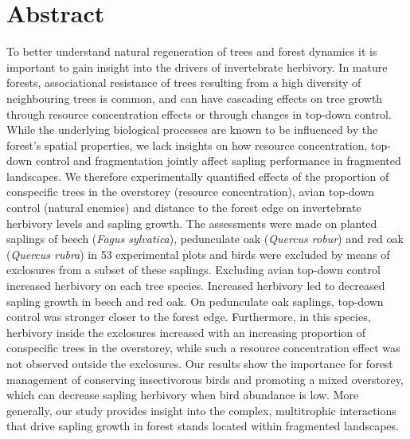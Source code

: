 \documentclass[10pt, twoside]{book} %
\begin{document}
	\section{Abstract}
	To better understand natural regeneration of trees and forest dynamics it is important to gain insight into the drivers of invertebrate herbivory. In mature forests, associational resistance of trees resulting from a high diversity of neighbouring trees is common, and can have cascading effects on tree growth through resource concentration effects or through changes in top-down control. While the underlying biological processes are known to be influenced by the forest's spatial properties, we lack insights on how resource concentration, top-down control and fragmentation jointly affect sapling performance in fragmented landscapes. We therefore experimentally quantified effects of the proportion of conspecific trees in the overstorey (resource concentration), avian top-down control (natural enemies) and distance to the forest edge on invertebrate herbivory levels and sapling growth. The assessments were made on planted saplings of beech (\textit{Fagus sylvatica}), pedunculate oak (\textit{Quercus robur}) and red oak (\textit{Quercus rubra}) in 53 experimental plots and birds were excluded by means of exclosures from a subset of these saplings. Excluding avian top-down control increased herbivory on each tree species. Increased herbivory led to decreased sapling growth in beech and red oak. On pedunculate oak saplings, top-down control was stronger closer to the forest edge. Furthermore, in this species, herbivory inside the exclosures increased with an increasing proportion of conspecific trees in the overstorey, while such a resource concentration effect was not observed outside the exclosures. Our results show the importance for forest management of conserving insectivorous birds and promoting a mixed overstorey, which can decrease sapling herbivory when bird abundance is low. More generally, our study provides insight into the complex, multitrophic interactions that drive sapling growth in forest stands located within fragmented landscapes.\\
	\clearpage
	
\end{document}
